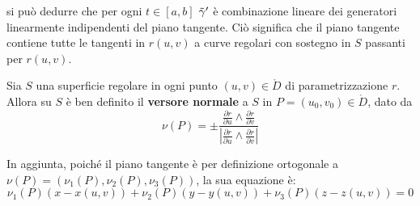 si può dedurre che per ogni $t \in [a,b]$ $\Tilde{\gamma}'$ è combinazione lineare dei generatori linearmente indipendenti del piano tangente. Ciò significa che il piano tangente contiene tutte le tangenti in $r(u,v)$ a curve regolari con sostegno in $S$ passanti per $r(u,v)$.
\begin{definition} \label{Def: Versore normale a una superficie}
    Sia $S$ una superficie regolare in ogni punto $(u,v)\in \mathring{D}$ di parametrizzazione $r$. Allora su $S$ è ben definito il \textbf{versore normale} a $S$ in $P=(u_0,v_0) \in \mathring{D}$, dato da
    \begin{equation*}
        \nu(P)= \pm \frac{\frac{\partial r}{\partial u} \wedge \frac{\partial r}{\partial v}}{\left|\frac{\partial r}{\partial u} \wedge \frac{\partial r}{\partial v}\right|}
    \end{equation*}
\end{definition}
    In aggiunta, poiché il piano tangente è per definizione ortogonale a $\nu(P)=(\nu_1(P), \nu_2(P), \nu_3(P))$, la sua equazione è:
    \begin{equation} \label{Eq: Equazione piano tangente a una superficie}
        \nu_1(P)(x-x(u,v))+ \nu_2(P)(y-y(u,v))+\nu_3(P)(z-z(u,v))=0
    \end{equation}
